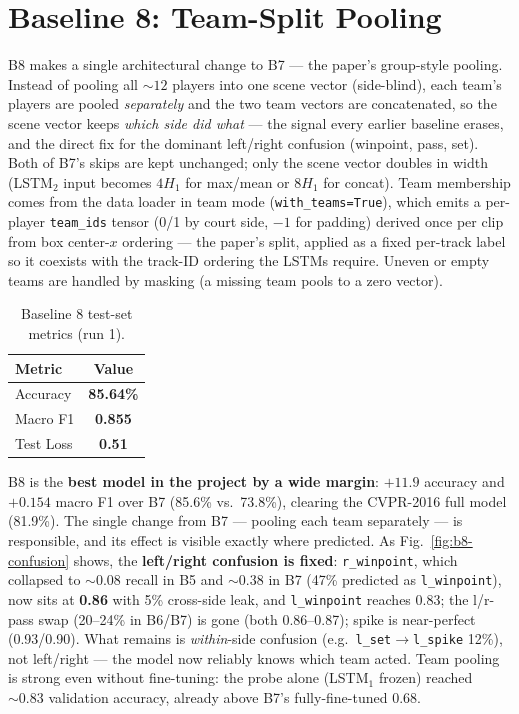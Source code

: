 \documentclass[9pt,a4paper,twocolumn,twoside]{tau-class/tau}
\begin{document}
\section{Baseline 8: Team-Split Pooling}

B8 makes a single architectural change to B7 --- the paper's group-style pooling. Instead of pooling all ${\sim}12$ players into one scene vector (side-blind), each team's players are pooled \emph{separately} and the two team vectors are concatenated, so the scene vector keeps \emph{which side did what} --- the signal every earlier baseline erases, and the direct fix for the dominant left/right confusion (winpoint, pass, set). Both of B7's skips are kept unchanged; only the scene vector doubles in width (LSTM$_2$ input becomes $4H_1$ for max/mean or $8H_1$ for concat). Team membership comes from the data loader in team mode (\texttt{with\_teams=True}), which emits a per-player \texttt{team\_ids} tensor (0/1 by court side, $-1$ for padding) derived once per clip from box center-$x$ ordering --- the paper's split, applied as a fixed per-track label so it coexists with the track-ID ordering the LSTMs require. Uneven or empty teams are handled by masking (a missing team pools to a zero vector).

\begin{table}[h]
    \centering
    \caption{Baseline 8 test-set metrics (run 1).}
    \label{tab:b8-metrics}
    \begin{tabular}{lc}
        \toprule
        \textbf{Metric} & \textbf{Value} \\
        \midrule
        Accuracy   & \textbf{85.64\%} \\
        Macro F1   & \textbf{0.855} \\
        Test Loss  & \textbf{0.51} \\
        \bottomrule
    \end{tabular}
\end{table}

B8 is the \textbf{best model in the project by a wide margin}: $+11.9$ accuracy and $+0.154$ macro F1 over B7 (85.6\% vs.\ 73.8\%), clearing the CVPR-2016 full model (81.9\%). The single change from B7 --- pooling each team separately --- is responsible, and its effect is visible exactly where predicted. As Fig.~\ref{fig:b8-confusion} shows, the \textbf{left/right confusion is fixed}: \texttt{r\_winpoint}, which collapsed to ${\sim}0.08$ recall in B5 and ${\sim}0.38$ in B7 (47\% predicted as \texttt{l\_winpoint}), now sits at \textbf{0.86} with 5\% cross-side leak, and \texttt{l\_winpoint} reaches 0.83; the l/r-pass swap (20--24\% in B6/B7) is gone (both 0.86--0.87); spike is near-perfect (0.93/0.90). What remains is \emph{within}-side confusion (e.g.\ \texttt{l\_set}$\to$\texttt{l\_spike} 12\%), not left/right --- the model now reliably knows which team acted. Team pooling is strong even without fine-tuning: the probe alone (LSTM$_1$ frozen) reached ${\sim}0.83$ validation accuracy, already above B7's fully-fine-tuned 0.68.
\end{document}
